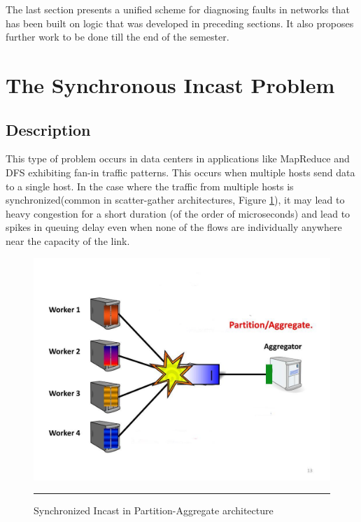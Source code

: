 The last section presents a unified scheme for diagnosing faults in networks that has been built on logic that was developed
in preceding sections. It also proposes further work to be done till the end of the semester.
\section{The Synchronous Incast Problem}

\subsection{Description}

This type of problem occurs in data centers in applications like MapReduce and DFS exhibiting fan-in traffic patterns.
This occurs when multiple hosts send data to a single host. In the case where the traffic from multiple hosts is
synchronized(common in scatter-gather architectures, Figure \ref{fig:Synch Incast}), it may lead to heavy congestion for a short duration (of the
order of microseconds) and lead to spikes in queuing delay even when none of the flows are individually anywhere near
the capacity of the link.

\begin{figure}[htbp]
	\centering
		\includegraphics[width=0.65\columnwidth]{Figures/sync_incast.jpg}
		\rule{35em}{0.5pt}
	\caption[Synchronized Incast]{Synchronized Incast in Partition-Aggregate architecture}
	\label{fig:Synch Incast}
\end{figure}

